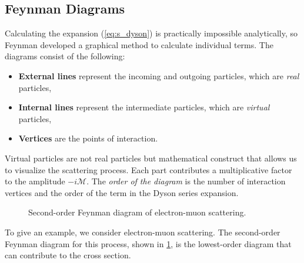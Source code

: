 \subsection{Feynman Diagrams}
\label{sec:feyman}
Calculating the expansion (\ref{eq:s_dyson}) is practically impossible analytically, so Feynman developed a graphical method to calculate individual terms.
The diagrams consist of the following:
\begin{itemize}
    \item \textbf{External lines} represent the incoming and outgoing particles, which are \emph{real} particles,
    \item \textbf{Internal lines} represent the intermediate particles, which are \emph{virtual} particles,
    \item \textbf{Vertices} are the points of interaction.    
\end{itemize}
Virtual particles are not real particles but mathematical construct that allows us to visualize the scattering process.
Each part contributes a multiplicative factor to the amplitude $-i\mathcal{M}$.
The \emph{order of the diagram} is the number of interaction vertices and the order of the term in the Dyson series expansion.

\begin{figure}[htb]
\caption{Second-order Feynman diagram of electron-muon scattering.}
\label{fig:electron_muon}
\end{figure}
To give an example, we consider electron-muon scattering.
The second-order Feynman diagram for this process, shown in \cref{fig:electron_muon}, is the lowest-order diagram that can contribute to the cross section.

